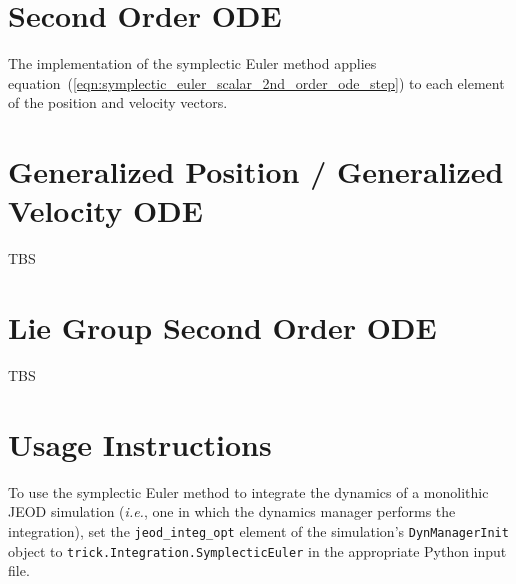 \section{Second Order ODE}

The \erseven implementation of the symplectic Euler method applies
equation~(\ref{eqn:symplectic_euler_scalar_2nd_order_ode_step})
to each element of the position and velocity vectors.

\section{Generalized Position / Generalized Velocity ODE}

TBS

\section{Lie Group Second Order ODE}

TBS

\section{Usage Instructions}

To use the symplectic Euler method to integrate the dynamics of a monolithic
JEOD simulation
(\emph{i.e.}, one in which the dynamics manager performs the integration),
set the {\tt{jeod\_integ\_opt}} element of the simulation's
{\tt{DynManagerInit}} object to {\tt{trick.Integration.SymplecticEuler}}
in the appropriate Python input file.
